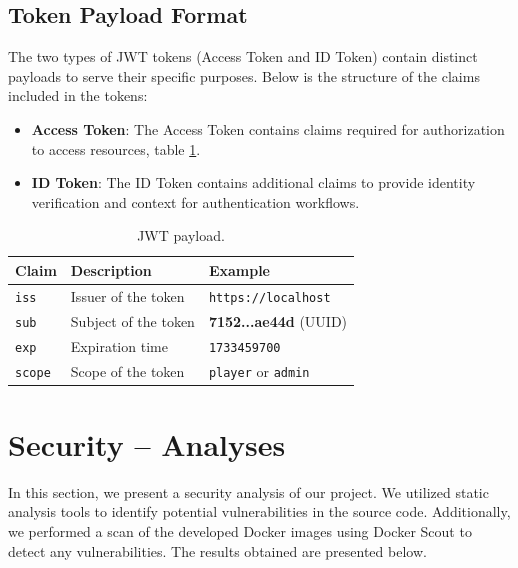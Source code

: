 \documentclass{article}
\begin{document}
\newpage

\subsection{Token Payload Format} The two types of JWT tokens (Access Token and ID Token) contain distinct payloads to serve their specific purposes. Below is the structure of the claims included in the tokens:

\begin{itemize}
    \item \textbf{Access Token}: The Access Token contains claims required for authorization to access resources, table \ref{tab:jwt-payload}.
    \item \textbf{ID Token}: The ID Token contains additional claims to provide identity verification and context for authentication workflows.
\end{itemize} 


\begin{table}[h!]
\centering
\begin{tabular}{@{}p{2cm}p{4cm}p{6cm}@{}}
\toprule
\textbf{Claim}    & \textbf{Description}          & \textbf{Example} \\ \midrule
\texttt{iss}      & Issuer of the token           & \texttt{https://localhost} \\
\texttt{sub}      & Subject of the token          & \textbf{7152...ae44d} (UUID) \\
\texttt{exp}      & Expiration time               & \texttt{1733459700} \\
\texttt{scope}    & Scope of the token            & \texttt{player} or \texttt{admin} \\
\end{tabular}
\caption{JWT payload.}
\label{tab:jwt-payload}
\end{table}
\newpage

\section{Security – Analyses}
In this section, we present a security analysis of our project. We utilized static analysis tools to identify potential vulnerabilities in the source code. Additionally, we performed a scan of the developed Docker images using Docker Scout to detect any vulnerabilities. The results obtained are presented below.
\end{document}
